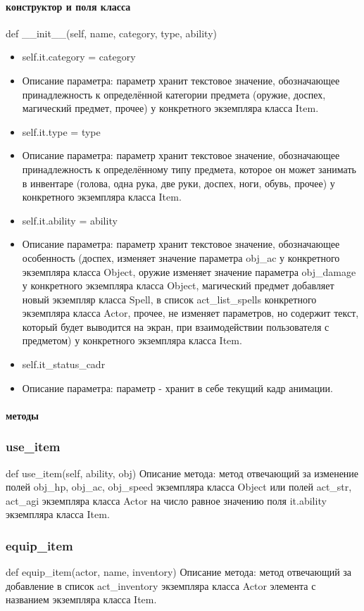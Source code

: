 \paragraph{конструктор и поля класса}
def \_\_init\_\_(self, name, category, type, ability)
\begin{itemize}
	\item self.it.category = category 
	\item Описание параметра: параметр хранит текстовое значение, обозначающее принадлежность к определённой категории предмета (оружие, доспех, магический предмет, прочее) у конкретного экземпляра класса Item.
	\item self.it.type = type 
	\item Описание параметра: параметр хранит текстовое значение, обозначающее принадлежность к определённому типу предмета, которое он может занимать в инвентаре (голова, одна рука, две руки, доспех, ноги, обувь, прочее) у конкретного экземпляра класса Item.
	\item self.it.ability = ability %
	\item Описание параметра: параметр хранит текстовое значение, обозначающее особенность (доспех, изменяет значение параметра obj\_ac у конкретного экземпляра класса Object, оружие изменяет значение параметра obj\_damage у конкретного экземпляра класса Object, магический предмет добавляет новый экземпляр класса Spell, в список act\_list\_spells конкретного экземпляра класса Actor, прочее, не изменяет параметров, но содержит текст, который будет выводится на экран, при взаимодействии пользователя с предметом) у конкретного экземпляра класса Item.
	\item self.it\_status\_cadr
	\item Описание параметра: параметр - хранит в себе текущий кадр анимации.
\end{itemize}
\paragraph{методы}
\subsubsection{use\_item}
def use\_item(self, ability, obj)
Описание метода: метод отвечающий за изменение полей obj\_hp, obj\_ac, obj\_speed экземпляра класса Object или полей act\_str, act\_agi экземпляра класса Actor на число равное значению поля it.ability экземпляра класса Item.
\subsubsection{equip\_item}
def equip\_item(actor, name, inventory)
Описание метода: метод отвечающий за добавление в список act\_inventory экземпляра класса Actor элемента с названием экземпляра класса Item.


